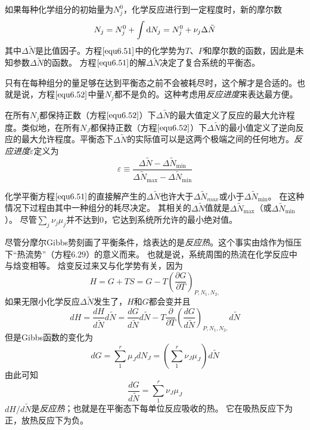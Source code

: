 如果每种化学组分的初始量为$N_j^0$，化学反应进行到一定程度时，新的摩尔数
\begin{equation}
\label{equ6.52}
	N_j = N_j^0 + \int \mathrm{d} N_j = N_j^0 + \nu_j \Delta\tilde{N}
\end{equation}
其中$\Delta\tilde{N}$是比值因子。方程$\eqref{equ6.51}$中的化学势为$T$、$P$和摩尔数的函数，因此是未知参数$\Delta\tilde{N}$的函数。
方程$\eqref{equ6.51}$的解$\Delta\tilde{N}$决定了复合系统的平衡态。

只有在每种组分的量足够在达到平衡态之前不会被耗尽时，这个解才是合适的。也就是说，方程$\eqref{equ6.52}$中量$N_j$都不是负的。这种考虑用{\it 反应进度}来表达最方便。

在所有$N_j$都保持正数（方程$\eqref{equ6.52}$）下$\Delta\tilde{N}$的最大值定义了反应的最大允许程度。类似地，在所有$N_J$都保持正数（方程$\eqref{equ6.52}$）下$\Delta\tilde{N}$的最小值定义了逆向反应的最大允许程度。平衡态下$\Delta\tilde{N}$的实际值可以是这两个极端之间的任何地方。{\it 反应进度}$\varepsilon$定义为
\begin{equation}
\label{equ6.53}
	\varepsilon \equiv \frac{\Delta\tilde{N}-\Delta\tilde{N}_{ \text{min} }}{\Delta\tilde{N}_{ \text{max} }-\Delta\tilde{N}_{ \text{min} }}
\end{equation}

化学平衡方程$\eqref{equ6.51}$的直接解产生的$\Delta\tilde{N}$也许大于$\Delta\tilde{N}_{max}$或小于$\Delta\tilde{N}_{ \text{min}}$。
在这种情况下过程由其中一种组分的耗尽决定。
其相关的$\Delta\tilde{N}$值就是$\Delta\tilde{N}_{ \text{max} }$（或$\Delta\tilde{N}_{ \text{min} }$）。
尽管$\sum_{j} \nu_{j} \mu_{j}$并不达到$0$，它达到系统所允许的最小绝对值。

尽管分摩尔Gibbs势刻画了平衡条件，焓表达的是\emph{反应热}。这个事实由焓作为恒压下“热流势”（方程$6.29$）的意义而来。
也就是说，系统周围的热流在化学反应中与焓变相等。
焓变反过来又与化学势有关，因为
\begin{equation}
\label{equ6.54}
H=G+TS=G-T\left(\frac{\partial G}{\partial T}\right)_{P, N_1, N_2,}
\end{equation}
如果无限小化学反应$\Delta\tilde{N}$发生了，$H$和$G$都会变并且
\begin{equation}
\label{equ6.55}
dH=\frac{dH}{d\tilde{N}}d\tilde{N}=\frac{dG}{d\tilde{N}}d\tilde{N}-T\frac{\partial}{\partial T}\left(\frac{dG}{d\tilde{N}}\right)_{P, N_1, N_2,}d\tilde{N}
\end{equation}
但是Gibbs函数的变化为
\begin{equation}
\label{equ6.56}
dG=\sum_{1}^{r}\mu_JdN_J=\left(\sum_1^r \nu_J\mu_J \right)d\tilde{N}
\end{equation}
由此可知
\begin{equation}
\label{equ6.57}
\frac{dG}{d\tilde{N}}=\sum_1^r \nu_J\mu_J
\end{equation}
$dH/d\tilde{N}$是\emph{反应热}；也就是在平衡态下每单位反应吸收的热。
它在吸热反应下为正，放热反应下为负。

